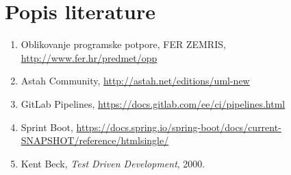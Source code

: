 \chapter*{Popis literature}
	 	
 		\begin{enumerate}
			
			
			\item  Oblikovanje programske potpore, FER ZEMRIS, \url{http://www.fer.hr/predmet/opp}
			
			\item Astah Community, \url{http://astah.net/editions/uml-new}
			\item GitLab Pipelines, \url{https://docs.gitlab.com/ee/ci/pipelines.html}
			\item Sprint Boot, \url{https://docs.spring.io/spring-boot/docs/current-SNAPSHOT/reference/htmlsingle/}
			\item Kent Beck, \textit{Test Driven Development}, 2000.
		\end{enumerate}
		
		 